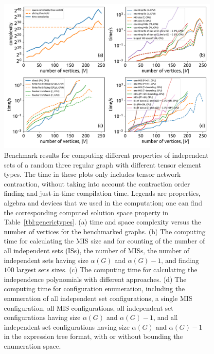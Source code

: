 \documentclass[onefignum, onetabnum]{siamart190516}
\newcommand{\<}{\langle}
\renewcommand{\>}{\rangle}
\newcommand{\Tbl}[1]{Table~\ref{#1}}
\begin{document}
\begin{figure} 
    \centering
    \includegraphics[width=\textwidth, trim={0cm 0cm 0cm 0cm}, clip]{figures/fig1.pdf}
    \caption{Benchmark results for computing different properties of independent sets of a random three regular graph with different tensor element types.
    The time in these plots only includes tensor network contraction, without taking into account the contraction order finding and just-in-time compilation time.
    Legends are properties, algebra and devices that we used in the computation; one can find the corresponding computed solution space property in \Tbl{tbl:generictypes}.
    (a) time and space complexity versus the number of vertices for the benchmarked graphs.
    (b) The computing time for calculating the MIS size and for counting of the number of all independent sets (ISs), the number of MISs,
        the number of independent sets having size $\alpha(G)$ and $\alpha(G)-1$, and finding $100$ largest sets sizes.
    (c) The computing time for calculating the independence polynomials with different approaches.
    (d) The computing time for configuration enumeration, including the enumeration of all independent set configurations, a single MIS configuration, all MIS configurations,
    all independent set configurations having size $\alpha(G)$ and $\alpha(G)-1$, and all independent set configurations having size $\alpha(G)$ and $\alpha(G)-1$ in the expression tree format,
    with or without bounding the enumeration space.
    }
    \label{fig:benchmark}
\end{figure}
\end{document}
